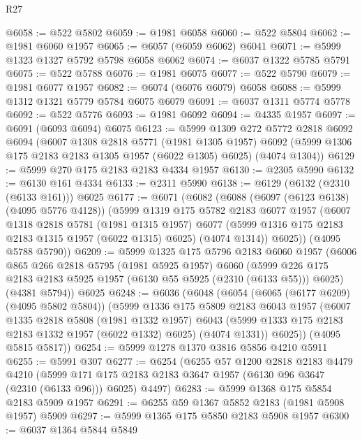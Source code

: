\begin{lexlean}{R27}
\begin{coremodule}
@6058 := @522 @5802
@6059 := @1981 @6058
@6060 := @522 @5804
@6062 := @1981 @6060 @1957
@6065 := @6057 (@6059 @6062) @6041
@6071 := @5999 @1323 @1327 @5792 @5798 @6058 @6062
@6074 := @6037 @1322 @5785 @5791
@6075 := @522 @5788
@6076 := @1981 @6075
@6077 := @522 @5790
@6079 := @1981 @6077 @1957
@6082 := @6074 (@6076 @6079) @6058
@6088 := @5999 @1312 @1321 @5779 @5784 @6075 @6079
@6091 := @6037 @1311 @5774 @5778
@6092 := @522 @5776
@6093 := @1981 @6092
@6094 := @4335 @1957
@6097 := @6091 (@6093 @6094) @6075
@6123 := @5999
    @1309
    @272
    @5772
    @2818
    @6092
    @6094
    (@6007
      @1308
      @2818
      @5771
      (@1981 @1305 @1957)
      @6092
      (@5999 @1306 @175 @2183 @2183 @1305 @1957 (@6022 @1305) @6025)
      (@4074 @1304))
@6129 := @5999 @270 @175 @2183 @2183 @4334 @1957
@6130 := @2305 @5990
@6132 := @6130 @161 @4334
@6133 := @2311 @5990
@6138 := @6129 (@6132 (@2310 (@6133 @161))) @6025
@6177 := @6071
    (@6082
      (@6088
        (@6097 (@6123 @6138) (@4095 @5776 @4128))
        (@5999
          @1319
          @175
          @5782
          @2183
          @6077
          @1957
          (@6007
            @1318
            @2818
            @5781
            (@1981 @1315 @1957)
            @6077
            (@5999 @1316 @175 @2183 @2183 @1315 @1957 (@6022 @1315) @6025)
            (@4074 @1314))
          @6025))
      (@4095 @5788 @5790))
@6209 := @5999
    @1325
    @175
    @5796
    @2183
    @6060
    @1957
    (@6006
      @865
      @266
      @2818
      @5795
      (@1981 @5925 @1957)
      @6060
      (@5999 @226 @175 @2183 @2183 @5925 @1957 (@6130 @55 @5925 (@2310 (@6133 @55))) @6025)
      (@4381 @5794))
    @6025
@6248 := @6036
    (@6048
      (@6054
        (@6065 (@6177 @6209) (@4095 @5802 @5804))
        (@5999
          @1336
          @175
          @5809
          @2183
          @6043
          @1957
          (@6007
            @1335
            @2818
            @5808
            (@1981 @1332 @1957)
            @6043
            (@5999 @1333 @175 @2183 @2183 @1332 @1957 (@6022 @1332) @6025)
            (@4074 @1331))
          @6025))
      (@4095 @5815 @5817))
@6254 := @5999 @1278 @1370 @3816 @5856 @4210 @5911
@6255 := @5991 @307
@6277 := @6254
    (@6255
      @57
      @1200
      @2818
      @2183
      @4479
      @4210
      (@5999 @171 @175 @2183 @2183 @3647 @1957 (@6130 @96 @3647 (@2310 (@6133 @96))) @6025)
      @4497)
@6283 := @5999 @1368 @175 @5854 @2183 @5909 @1957
@6291 := @6255 @59 @1367 @5852 @2183 (@1981 @5908 @1957) @5909
@6297 := @5999 @1365 @175 @5850 @2183 @5908 @1957
@6300 := @6037 @1364 @5844 @5849

\end{coremodule}
\end{lexlean}

